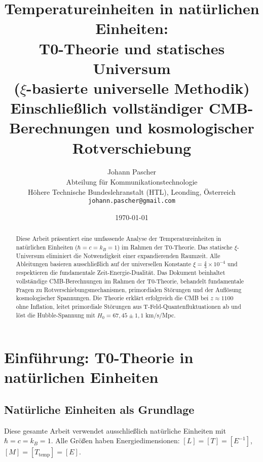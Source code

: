\documentclass[12pt,a4paper]{article}
\theoremstyle{definition}
\theoremstyle{remark}
\begin{document}
	
	\title{Temperatureinheiten in nat\"urlichen Einheiten: \\
		T0-Theorie und statisches Universum \\
		($\xi$-basierte universelle Methodik)\\
		\large Einschlie\ss{}lich vollst\"andiger CMB-Berechnungen und kosmologischer Rotverschiebung}
	\author{Johann Pascher\\
		Abteilung f\"ur Kommunikationstechnologie\\
		H\"ohere Technische Bundeslehranstalt (HTL), Leonding, \"Osterreich\\
		\texttt{johann.pascher@gmail.com}}
	\date{\today}
	
	\maketitle
	
	\begin{abstract}
		Diese Arbeit pr\"asentiert eine umfassende Analyse der Temperatureinheiten in nat\"urlichen Einheiten ($\hbar = c = k_B = 1$) im Rahmen der T0-Theorie. Das statische $\xi$-Universum eliminiert die Notwendigkeit einer expandierenden Raumzeit. Alle Ableitungen basieren ausschlie\ss{}lich auf der universellen Konstante $\xi = \frac{4}{3} \times 10^{-4}$ und respektieren die fundamentale Zeit-Energie-Dualit\"at. Das Dokument beinhaltet vollst\"andige CMB-Berechnungen im Rahmen der T0-Theorie, behandelt fundamentale Fragen zu Rotverschiebungsmechanismen, primordialen St\"orungen und der Aufl\"osung kosmologischer Spannungen. Die Theorie erkl\"art erfolgreich die CMB bei $z \approx 1100$ ohne Inflation, leitet primordiale St\"orungen aus T-Feld-Quantenfluktuationen ab und l\"ost die Hubble-Spannung mit $H_0 = 67,45 \pm 1,1$ km/s/Mpc.
	\end{abstract}
	
	\tableofcontents
	\newpage
	
	\section{Einf\"uhrung: T0-Theorie in nat\"urlichen Einheiten}
	
	\subsection{Nat\"urliche Einheiten als Grundlage}
	
	\begin{important}
		Diese gesamte Arbeit verwendet ausschlie\ss{}lich nat\"urliche Einheiten mit $\hbar = c = k_B = 1$. Alle Gr\"o\ss{}en haben Energiedimensionen: $[L] = [T] = [E^{-1}]$, $[M] = [T_{\text{temp}}] = [E]$.
	\end{important}
	
\end{document}
